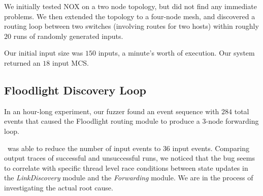 We initially tested NOX on a two node topology, but did not find any immediate
problems. We then extended the topology to a four-node mesh, and discovered a
routing loop between two switches (involving routes for two hosts) within
roughly $20$ runs of randomly generated inputs.

Our initial input size was $150$ inputs, a minute's worth of execution.
Our system returned an $18$ input MCS.

\tbd{}

\subsection{Floodlight Discovery Loop}

In an hour-long experiment,
our fuzzer found an event sequence with $284$ total events
that caused the Floodlight routing module to produce a 3-node forwarding loop.

\Simulator~was able to reduce the number of input events to $36$ input events.
Comparing output traces of successful and
unsuccessful runs, we noticed that the bug seems to correlate with specific
thread level race conditions between state updates in the \emph{LinkDiscovery} module and
the \emph{Forwarding} module. We are in the process of investigating the actual root cause.

\tbd{}

